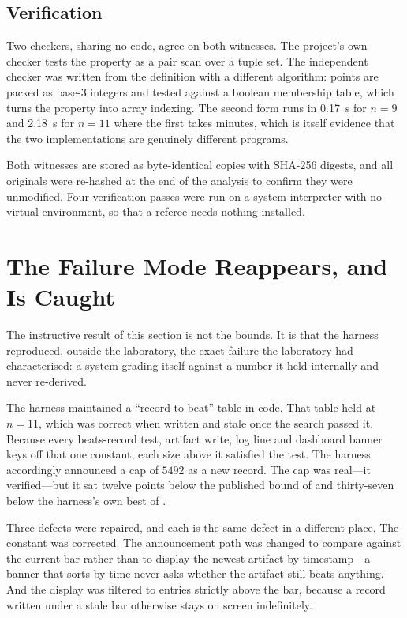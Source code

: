 \documentclass[journal]{IEEEtran}
\begin{document}
\subsection{Verification}
\label{sec:verify}

Two checkers, sharing no code, agree on both witnesses. The project's own
checker tests the property as a pair scan over a tuple set. The
independent checker was written from the definition with a different
algorithm: points are packed as base-3 integers and tested against a
boolean membership table, which turns the property into array indexing.
The second form runs in \SI{0.17}{s} for $n=9$ and \SI{2.18}{s} for
$n=11$ where the first takes minutes, which is itself evidence that the
two implementations are genuinely different programs.

Both witnesses are stored as byte-identical copies with SHA-256 digests,
and all originals were re-hashed at the end of the analysis to confirm
they were unmodified. Four verification passes were run on a system
interpreter with no virtual environment, so that a referee needs nothing
installed.

\section{The Failure Mode Reappears, and Is Caught}
\label{sec:falserecord}

The instructive result of this section is not the bounds. It is that the
harness reproduced, outside the laboratory, the exact failure the
laboratory had characterised: a system grading itself against a number it
held internally and never re-derived.

The harness maintained a ``record to beat'' table in code. That table
held \NumCapElevenPrior{} at $n=11$, which was correct when written and
stale once the search passed it. Because every beats-record test,
artifact write, log line and dashboard banner keys off that one constant,
each size above it satisfied the test. The harness accordingly announced
a cap of $5492$ as a new record. The cap was real---it verified---but it
sat twelve points below the published bound of \NumCapElevenPrior{} and
thirty-seven below the harness's own best of \NumCapEleven{}.

Three defects were repaired, and each is the same defect in a different
place. The constant was corrected. The announcement path was changed to
compare against the current bar rather than to display the newest
artifact by timestamp---a banner that sorts by time never asks whether
the artifact still beats anything. And the display was filtered to
entries strictly above the bar, because a record written under a stale
bar otherwise stays on screen indefinitely.
\end{document}
